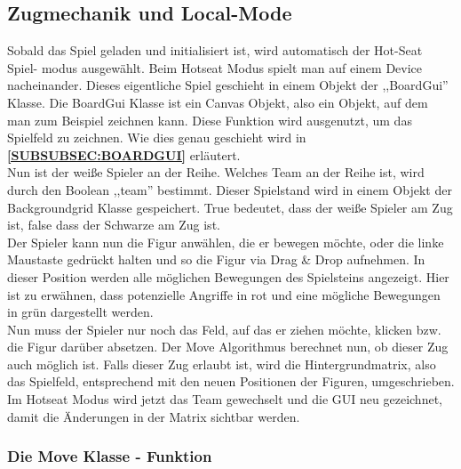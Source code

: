 \documentclass[12pt,a4paper]{article}
\begin{document}
{\newpage
\subsection{Zugmechanik und Local-Mode}
\label{SUBSEC:LOCAL_MODE}

Sobald das Spiel geladen und initialisiert ist, wird automatisch der Hot-Seat Spiel- modus ausgewählt. Beim Hotseat Modus spielt man auf einem Device nacheinander. Dieses eigentliche Spiel geschieht in einem Objekt der ,,BoardGui'' Klasse. Die BoardGui Klasse ist ein Canvas Objekt, also ein Objekt, auf dem man zum Beispiel zeichnen kann. Diese Funktion wird ausgenutzt, um das Spielfeld zu zeichnen. Wie dies genau geschieht wird in \textbf{ \ref{SUBSUBSEC:BOARDGUI}} 
erläutert.  \\
Nun ist der weiße Spieler an der Reihe. Welches Team an der Reihe ist, wird durch den Boolean ,,team'' bestimmt. Dieser Spielstand wird in einem Objekt der Backgroundgrid Klasse gespeichert. True bedeutet, dass der weiße Spieler am Zug ist, false dass der Schwarze am Zug ist. \\
Der Spieler kann nun die Figur anwählen, die er bewegen möchte, oder die linke Maustaste gedrückt halten und so die Figur via Drag \& Drop aufnehmen. In dieser Position werden alle möglichen Bewegungen des Spielsteins angezeigt. Hier ist zu erwähnen, dass potenzielle Angriffe in rot und eine mögliche Bewegungen in grün dargestellt werden.\\
Nun muss der Spieler nur noch das Feld, auf das er ziehen möchte, klicken bzw. die Figur darüber absetzen. Der Move Algorithmus berechnet nun, ob dieser Zug auch möglich ist. Falls dieser Zug erlaubt ist, wird die Hintergrundmatrix, also das Spielfeld, entsprechend mit den neuen Positionen der Figuren, umgeschrieben. \\
Im Hotseat Modus wird jetzt das Team gewechselt und die GUI neu gezeichnet, damit die Änderungen in der Matrix sichtbar werden. 

\subsubsection{Die Move Klasse - Funktion}
\label{SUBSUBSEC:MOVE}

}
\end{document}
